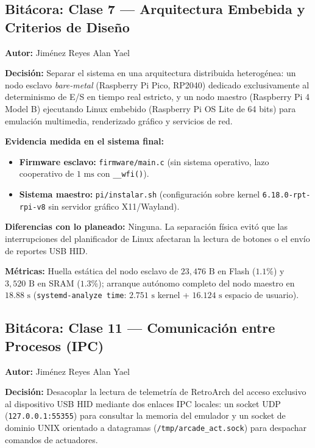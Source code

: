 
\subsection{Bitácora: Clase 7 — Arquitectura Embebida y Criterios de Diseño}
\textbf{Autor:} Jiménez Reyes Alan Yael

\textbf{Decisión:} Separar el sistema en una arquitectura distribuida heterogénea: un nodo esclavo \textit{bare-metal} (Raspberry Pi Pico, RP2040) dedicado exclusivamente al determinismo de E/S en tiempo real estricto, y un nodo maestro (Raspberry Pi 4 Model B) ejecutando Linux embebido (Raspberry Pi OS Lite de 64 bits) para emulación multimedia, renderizado gráfico y servicios de red.

\textbf{Evidencia medida en el sistema final:}
\begin{itemize}
	\item \textbf{Firmware esclavo:} \texttt{firmware/main.c} (sin sistema operativo, lazo cooperativo de $1\text{ ms}$ con \texttt{\_\_wfi()}).
	\item \textbf{Sistema maestro:} \texttt{pi/instalar.sh} (configuración sobre kernel \texttt{6.18.0-rpt-rpi-v8} sin servidor gráfico X11/Wayland).
\end{itemize}

\textbf{Diferencias con lo planeado:} Ninguna. La separación física evitó que las interrupciones del planificador de Linux afectaran la lectura de botones o el envío de reportes USB HID.

\textbf{Métricas:} Huella estática del nodo esclavo de $23{,}476\text{ B}$ en Flash ($1.1\%$) y $3{,}520\text{ B}$ en SRAM ($1.3\%$); arranque autónomo completo del nodo maestro en $18.88\text{ s}$ (\texttt{systemd-analyze time}: $2.751\text{ s}$ kernel + $16.124\text{ s}$ espacio de usuario).

\subsection{Bitácora: Clase 11 — Comunicación entre Procesos (IPC)}
\textbf{Autor:} Jiménez Reyes Alan Yael

\textbf{Decisión:} Desacoplar la lectura de telemetría de RetroArch del acceso exclusivo al dispositivo USB HID mediante dos enlaces IPC locales: un socket UDP (\texttt{127.0.0.1:55355}) para consultar la memoria del emulador y un socket de dominio UNIX orientado a datagramas (\texttt{/tmp/arcade\_act.sock}) para despachar comandos de actuadores.

